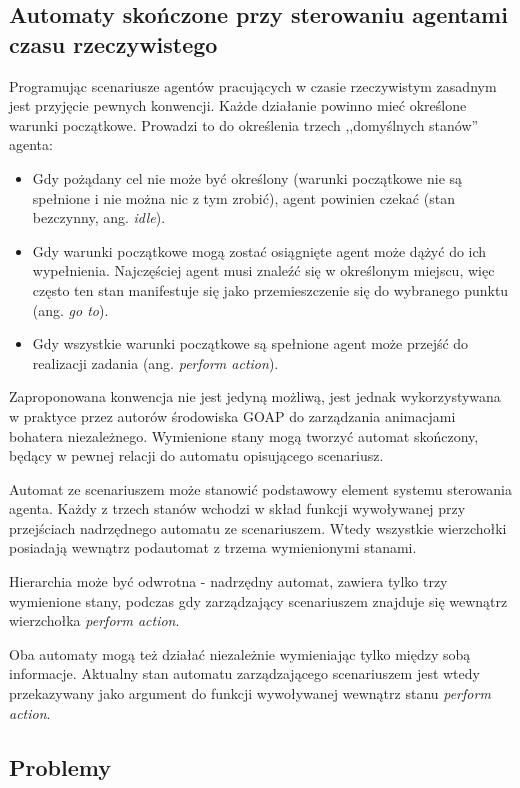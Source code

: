 \subsection{Automaty skończone przy sterowaniu agentami czasu rzeczywistego}
\label{subsec:3stany}
Programując scenariusze agentów pracujących w czasie rzeczywistym zasadnym jest przyjęcie pewnych konwencji. Każde działanie powinno mieć określone warunki początkowe. Prowadzi to do określenia trzech ,,domyślnych stanów'' agenta:~\cite{ORKIfear, OWEN}
\begin{itemize}
\setlength\itemsep{-0.4em}
    \item Gdy pożądany cel nie może być określony (warunki początkowe nie są spełnione i nie można nic z tym zrobić), agent powinien czekać (stan bezczynny, ang. \textit{idle}). 
    \item Gdy warunki początkowe mogą zostać osiągnięte agent może dążyć do ich wypełnienia. Najczęściej agent musi znaleźć się w określonym miejscu, więc często ten stan manifestuje się jako przemieszczenie się do wybranego punktu (ang. \textit{go to}). 
    \item Gdy wszystkie warunki początkowe są spełnione agent może przejść do realizacji zadania (ang. \textit{perform action}). 
\end{itemize}

Zaproponowana konwencja nie jest jedyną możliwą, jest jednak wykorzystywana w praktyce przez autorów środowiska GOAP do zarządzania animacjami bohatera niezależnego. Wymienione stany mogą tworzyć automat skończony, będący w pewnej relacji do automatu opisującego scenariusz.

Automat ze scenariuszem może stanowić podstawowy element systemu sterowania agenta. Każdy z trzech stanów wchodzi w skład funkcji wywoływanej przy przejściach nadrzędnego automatu ze scenariuszem. Wtedy wszystkie wierzchołki posiadają wewnątrz podautomat z trzema wymienionymi stanami. 

Hierarchia może być odwrotna - nadrzędny automat, zawiera tylko trzy wymienione stany, podczas gdy zarządzający scenariuszem znajduje się wewnątrz wierzchołka \textit{perform action}.

Oba automaty mogą też działać niezależnie wymieniając tylko między sobą informacje. Aktualny stan automatu zarządzającego scenariuszem jest wtedy przekazywany jako argument do funkcji wywoływanej wewnątrz stanu \textit{perform action}.

\subsection{Problemy}

